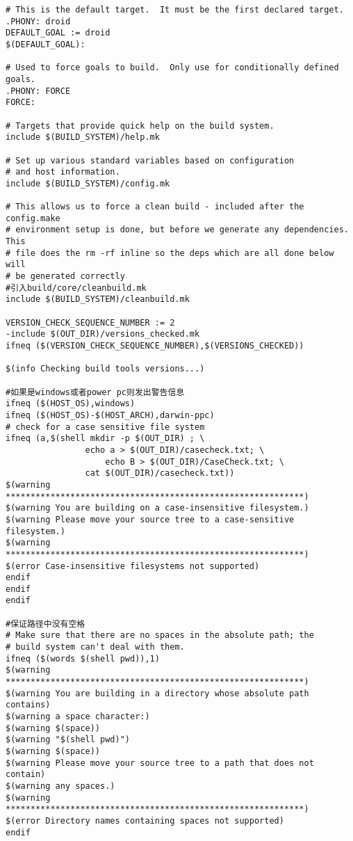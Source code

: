 \documentclass[12pt,a4paper]{article}
\begin{document}
\begin{verbatim}
# This is the default target.  It must be the first declared target.
.PHONY: droid
DEFAULT_GOAL := droid
$(DEFAULT_GOAL):

# Used to force goals to build.  Only use for conditionally defined goals.
.PHONY: FORCE
FORCE:

# Targets that provide quick help on the build system.
include $(BUILD_SYSTEM)/help.mk

# Set up various standard variables based on configuration
# and host information.
include $(BUILD_SYSTEM)/config.mk

# This allows us to force a clean build - included after the config.make
# environment setup is done, but before we generate any dependencies.  This
# file does the rm -rf inline so the deps which are all done below will
# be generated correctly
#引入build/core/cleanbuild.mk
include $(BUILD_SYSTEM)/cleanbuild.mk

VERSION_CHECK_SEQUENCE_NUMBER := 2
-include $(OUT_DIR)/versions_checked.mk
ifneq ($(VERSION_CHECK_SEQUENCE_NUMBER),$(VERSIONS_CHECKED))

$(info Checking build tools versions...)

#如果是windows或者power pc则发出警告信息
ifneq ($(HOST_OS),windows)
ifneq ($(HOST_OS)-$(HOST_ARCH),darwin-ppc)
# check for a case sensitive file system
ifneq (a,$(shell mkdir -p $(OUT_DIR) ; \
                echo a > $(OUT_DIR)/casecheck.txt; \
                    echo B > $(OUT_DIR)/CaseCheck.txt; \
                cat $(OUT_DIR)/casecheck.txt))
$(warning ************************************************************)
$(warning You are building on a case-insensitive filesystem.)
$(warning Please move your source tree to a case-sensitive filesystem.)
$(warning ************************************************************)
$(error Case-insensitive filesystems not supported)
endif
endif
endif

#保证路径中没有空格
# Make sure that there are no spaces in the absolute path; the
# build system can't deal with them.
ifneq ($(words $(shell pwd)),1)
$(warning ************************************************************)
$(warning You are building in a directory whose absolute path contains)
$(warning a space character:)
$(warning $(space))
$(warning "$(shell pwd)")
$(warning $(space))
$(warning Please move your source tree to a path that does not contain)
$(warning any spaces.)
$(warning ************************************************************)
$(error Directory names containing spaces not supported)
endif


\end{verbatim}
\end{document}
